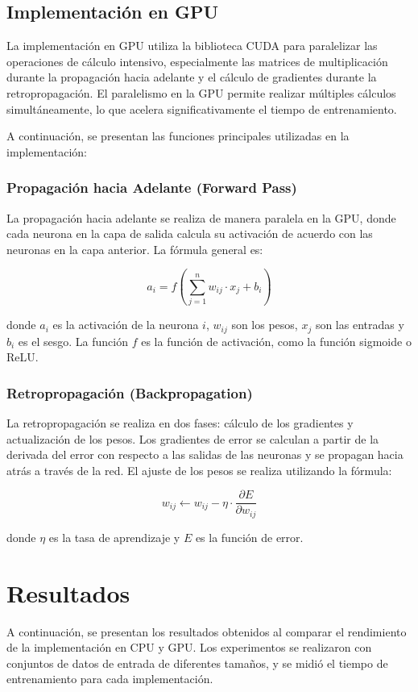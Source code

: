\documentclass[12pt]{article}
\begin{document}
\subsection{Implementación en GPU}
La implementación en GPU utiliza la biblioteca CUDA para paralelizar las operaciones de cálculo intensivo, especialmente las matrices de multiplicación durante la propagación hacia adelante y el cálculo de gradientes durante la retropropagación. El paralelismo en la GPU permite realizar múltiples cálculos simultáneamente, lo que acelera significativamente el tiempo de entrenamiento.

A continuación, se presentan las funciones principales utilizadas en la implementación:

\subsubsection{Propagación hacia Adelante (Forward Pass)}
La propagación hacia adelante se realiza de manera paralela en la GPU, donde cada neurona en la capa de salida calcula su activación de acuerdo con las neuronas en la capa anterior. La fórmula general es:

\[
a_i = f\left(\sum_{j=1}^{n} w_{ij} \cdot x_j + b_i \right)
\]

donde \(a_i\) es la activación de la neurona \(i\), \(w_{ij}\) son los pesos, \(x_j\) son las entradas y \(b_i\) es el sesgo. La función \(f\) es la función de activación, como la función sigmoide o ReLU.

\subsubsection{Retropropagación (Backpropagation)}
La retropropagación se realiza en dos fases: cálculo de los gradientes y actualización de los pesos. Los gradientes de error se calculan a partir de la derivada del error con respecto a las salidas de las neuronas y se propagan hacia atrás a través de la red. El ajuste de los pesos se realiza utilizando la fórmula:

\[
w_{ij} \leftarrow w_{ij} - \eta \cdot \frac{\partial E}{\partial w_{ij}}
\]

donde \(\eta\) es la tasa de aprendizaje y \(E\) es la función de error.

\section{Resultados}
A continuación, se presentan los resultados obtenidos al comparar el rendimiento de la implementación en CPU y GPU. Los experimentos se realizaron con conjuntos de datos de entrada de diferentes tamaños, y se midió el tiempo de entrenamiento para cada implementación.
\end{document}
